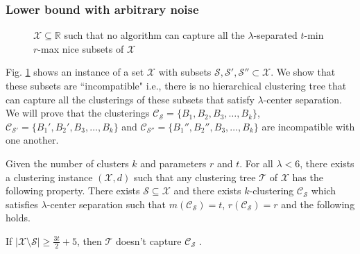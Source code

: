 \documentclass[anon,12pt]{colt2016} %
\newcommand{\mc}{\mathcal}
\begin{document}
\subsubsection{Lower bound with arbitrary noise}
\label{section:lambdaLowerBoundArbitrary}
\begin{figure}

\caption{$\mc X \subseteq \mathbb{R}$ such that no algorithm can capture all the $\lambda$-separated $t$-min $r$-max nice subsets of $\mc X$}
\label{fig:nosparsealglambdacs}
\end{figure}


Fig. \ref{fig:nosparsealglambdacs} shows an instance of a set $\mc X$ with subsets $\mc S, \mc S', \mc S'' \subset \mc X$. We show that these subsets are ``incompatible" i.e., there is no hierarchical clustering tree that can capture all the clusterings of these subsets that satisfy $\lambda$-center separation. We will prove that the clusterings $\mc C_{\mc S} = \{B_1, B_2, B_3, \ldots, B_k\}$, $\mc C_{\mc S'} = \{B_1', B_2', B_3, \ldots, B_k\}$ and $\mc C_{\mc S''} = \{B_1'', B_2'', B_3, \ldots, B_k\}$ are incompatible with one another.

\begin{theorem}
Given the number of clusters $k$ and parameters $r$ and $t$. For all $\lambda < 6$, there exists a clustering instance $(\mc X , d)$ such that any clustering tree $\mc T$ of $\mc X$ has the following property. There exists $\mc S \subseteq \mc X$ and there exists $k$-clustering $\mc C_{\mc S}$ which satisfies $\lambda$-center separation such that $m(\mc C_{\mc S}) = t$, $r(\mc C_{\mc S}) = r$ and the following holds.

If $|\mc X\setminus \mc S|\ge \frac{3t}{2}+5$, then $\mc T$ doesn't capture $\mc C_{\mc S}$ .
\end{theorem}
\end{document}
